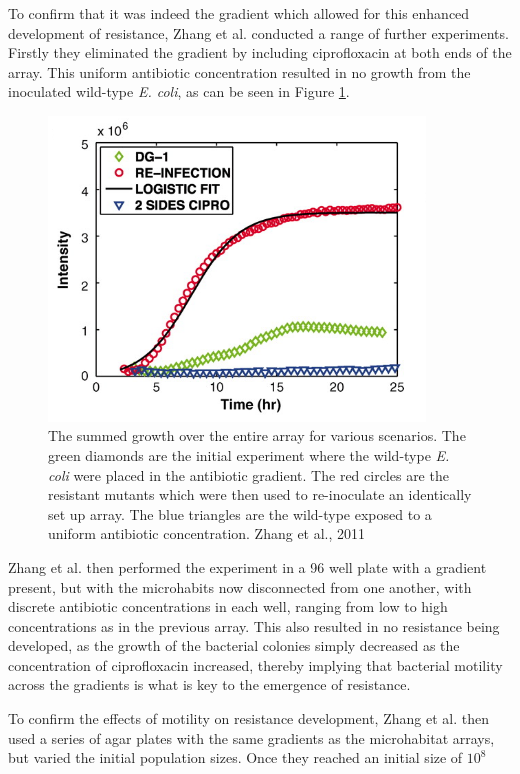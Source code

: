 \documentclass[a4paper,12pt]{article}
\begin{document}
To confirm that it was indeed the gradient which allowed for this enhanced development of resistance, Zhang et al. conducted a range of further experiments.
Firstly they eliminated the gradient by including ciprofloxacin at both ends of the array.  This uniform antibiotic concentration resulted in no growth
from the inoculated wild-type \textit{E. coli}, as can be seen in Figure \ref{fig:Zhang-gradient-growth-graph}.

\begin{figure}[H]
 \centering
 \includegraphics[width=10cm]{Zhang-microhab-gradient-growth-graph}
 \caption{The summed growth over the entire array for various scenarios.  The green diamonds are the initial experiment where the wild-type \textit{E. coli}
 were placed in the antibiotic gradient.  The red circles are the resistant mutants which were then used to re-inoculate an identically set up array.
 The blue triangles are the wild-type exposed to a uniform antibiotic concentration.  Zhang et al., 2011}
 \label{fig:Zhang-gradient-growth-graph}
\end{figure}


Zhang et al. then performed the experiment in a 96 well plate with a gradient present, but with the microhabits now disconnected from one another, with discrete 
antibiotic concentrations in each well, ranging from low to high concentrations as in the previous array.  This also resulted in no resistance being developed,
as the growth of the bacterial colonies simply decreased as the concentration of ciprofloxacin increased, thereby implying that bacterial motility across the 
gradients is what is key to the emergence of resistance.  

To confirm the effects of motility on resistance development, Zhang et al. then used a series of agar plates with the same gradients as the microhabitat arrays,
but varied the initial population sizes.  Once they reached an initial size of $10^8$
\end{document}
